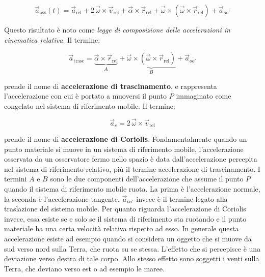 \begin{equation}
	\boxed{\vec{a}_{\text{ass}}(t)=\vec{a}_{\text{rel}} +2\,\vec{\omega} \times \vec{v}_{\text{rel}}+\vec{\alpha}\times \vec{r}_{\text{rel}}+ \vec{\omega}\times({\vec{\omega}}\times \vec{r}_{\text{rel}})+\vec{a}_{oo'}}
\end{equation}

Questo risultato è noto come \emph{legge di composizione delle accelerazioni in cinematica relativa}. Il termine:

\[
	\vec{a}_{\text{trasc}}=\underbrace{\vec{\alpha}\times \vec{r}_{\text{rel}}}_A+ \underbrace{\vec{\omega}\times({\vec{\omega}}\times \vec{r}_{\text{rel}})}_B+\vec{a}_{oo'}
\]

prende il nome di \textbf{accelerazione di trascinamento}, e rappresenta l'accelerazione con cui è portato a muoversi il punto $P$ immaginato come congelato nel sistema di riferimento mobile. Il termine:

\[
	\vec{a}_c= 2\,\vec{\omega} \times \vec{v}_{\text{rel}}
\]

prende il nome di \textbf{accelerazione di Coriolis}.
Fondamentalmente quando un punto materiale si muove in un sistema di riferimento mobile, l'accelerazione osservata da un osservatore fermo nello spazio è data dall'accelerazione percepita nel sistema di riferimento relativo, più il termine accelerazione di trascinamento.
I termini $A$ e $B$ sono le due componenti dell'accelerazione che assume il punto $P$ quando il sistema di riferimento mobile ruota. La prima è l'accelerazione normale, la seconda è l'accelerazione tangente. $\vec{a}_{oo'}$ invece è il termine legato alla traslazione del sistema mobile.
Per quanto riguarda l'accelerazione di Coriolis invece, essa esiste se e solo se il sistema di riferimento sta ruotando e il punto materiale ha una certa velocità relativa rispetto ad esso. In generale questa accelerazione esiste ad esempio quando si considera un oggetto che si muove da sud verso nord sulla Terra, che ruota su se stessa. L'effetto che si percepisce è una deviazione verso destra di tale corpo. Allo stesso effetto sono soggetti i venti sulla Terra, che deviano verso est o ad esempio le maree.
